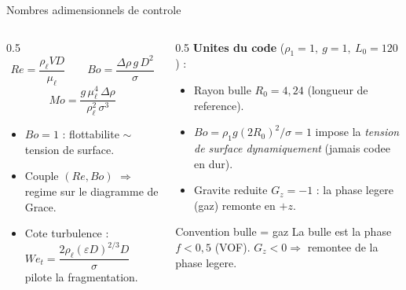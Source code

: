 \documentclass[11pt,aspectratio=169]{beamer}
\begin{document}
\begin{frame}{Nombres adimensionnels de controle}
  \begin{columns}[T]
    \begin{column}{0.5\textwidth}
      \[ Re = \frac{\rho_\ell V D}{\mu_\ell} \qquad
         Bo = \frac{\Delta\rho\, g\, D^2}{\sigma} \]
      \[ Mo = \frac{g\,\mu_\ell^4\,\Delta\rho}{\rho_\ell^2\,\sigma^3} \]
      \begin{itemize}
        \item $Bo=1$ : flottabilite $\sim$ tension de surface.
        \item Couple $(Re,Bo)$ $\Rightarrow$ regime sur le diagramme de Grace.
        \item Cote turbulence : $We_t = \dfrac{2\rho_\ell(\varepsilon D)^{2/3}D}{\sigma}$
              pilote la fragmentation.
      \end{itemize}
    \end{column}
    \begin{column}{0.5\textwidth}
      \footnotesize
      \textbf{Unites du code} ($\rho_1=1,\ g=1,\ L_0=120$) :
      \begin{itemize}
        \item Rayon bulle $R_0 = 4{,}24$ (longueur de reference).
        \item $Bo = \rho_1 g (2R_0)^2/\sigma = 1$ impose la \emph{tension de
              surface dynamiquement} (jamais codee en dur).
        \item Gravite reduite $G_z = -1$ : la phase legere (gaz) remonte en $+z$.
      \end{itemize}
      \vspace{0.4em}
      \begin{block}{Convention bulle = gaz}
        La bulle est la phase $f<0{,}5$ (VOF). $G_z<0 \Rightarrow$ remontee
        de la phase legere.
      \end{block}
    \end{column}
  \end{columns}
\end{frame}
\end{document}
